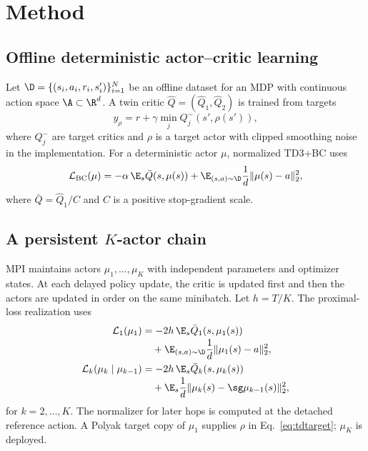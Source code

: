 \section{Method}
\label{sec:method}

\subsection{Offline deterministic actor--critic learning}

Let $\D=\{(s_i,a_i,r_i,s_i')\}_{i=1}^N$ be an offline dataset for an MDP with continuous action space $\A\subset\R^d$. A twin critic $\widehat Q=(\widehat Q_1,\widehat Q_2)$ is trained from targets
\begin{equation}
 y_\rho=r+\gamma\min_j Q_j^-(s',\rho(s')),                    \label{eq:tdtarget}
\end{equation}
where $Q_j^-$ are target critics and $\rho$ is a target actor with clipped smoothing noise in the implementation. For a deterministic actor $\mu$, normalized TD3+BC uses
\begin{equation}
 \mathcal L_{\rm BC}(\mu)
 =-\alpha\,\E_s \bar Q(s,\mu(s))
 +\E_{(s,a)\sim\D}\frac{1}{d}\|\mu(s)-a\|_2^2,             \label{eq:td3bc}
\end{equation}
where $\bar Q=\widehat Q_1/C$ and $C$ is a positive stop-gradient scale.

\subsection{A persistent $K$-actor chain}

MPI maintains actors $\mu_1,\ldots,\mu_K$ with independent parameters and optimizer states. At each delayed policy update, the critic is updated first and then the actors are updated in order on the same minibatch. Let $h=T/K$. The proximal-loss realization uses
\begin{equation}
\begin{aligned}
\mathcal L_1(\mu_1)
 &=-2h\,\E_s\bar Q_1(s,\mu_1(s))\\[-2pt]
 &\quad+\E_{(s,a)\sim\D}\frac{1}{d}\|\mu_1(s)-a\|_2^2,\\
\mathcal L_k(\mu_k\mid\mu_{k-1})
 &=-2h\,\E_s\bar Q_k(s,\mu_k(s))\\[-2pt]
 &\quad+\E_s\frac{1}{d}\|\mu_k(s)-\sg\mu_{k-1}(s)\|_2^2,
\end{aligned}                                                     \label{eq:actorchain}
\end{equation}
for $k=2,\ldots,K$. The normalizer for later hops is computed at the detached reference action. A Polyak target copy of $\mu_1$ supplies $\rho$ in Eq.~\eqref{eq:tdtarget}; $\mu_K$ is deployed.

